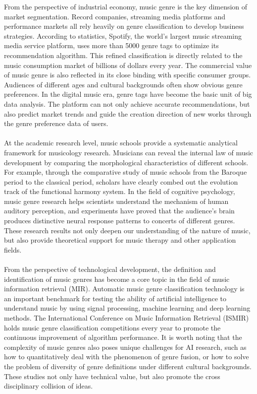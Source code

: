 From the perspective of industrial economy, music genre is the key dimension of market segmentation. Record companies, streaming media platforms and performance markets all rely heavily on genre classification to develop business strategies. According to statistics, Spotify, the world's largest music streaming media service platform, uses more than 5000 genre tags to optimize its recommendation algorithm. This refined classification is directly related to the music consumption market of billions of dollars every year. The commercial value of music genre is also reflected in its close binding with specific consumer groups. Audiences of different ages and cultural backgrounds often show obvious genre preferences. In the digital music era, genre tags have become the basic unit of big data analysis. The platform can not only achieve accurate recommendations, but also predict market trends and guide the creation direction of new works through the genre preference data of users.\\
\\
At the academic research level, music schools provide a systematic analytical framework for musicology research. Musicians can reveal the internal law of music development by comparing the morphological characteristics of different schools. For example, through the comparative study of music schools from the Baroque period to the classical period, scholars have clearly combed out the evolution track of the functional harmony system. In the field of cognitive psychology, music genre research helps scientists understand the mechanism of human auditory perception, and experiments have proved that the audience's brain produces distinctive neural response patterns to concerts of different genres. These research results not only deepen our understanding of the nature of music, but also provide theoretical support for music therapy and other application fields.\\
\\
From the perspective of technological development, the definition and identification of music genres has become a core topic in the field of music information retrieval (MIR). Automatic music genre classification technology is an important benchmark for testing the ability of artificial intelligence to understand music by using signal processing, machine learning and deep learning methods. The International Conference on Music Information Retrieval (ISMIR) holds music genre classification competitions every year to promote the continuous improvement of algorithm performance. It is worth noting that the complexity of music genres also poses unique challenges for AI research, such as how to quantitatively deal with the phenomenon of genre fusion, or how to solve the problem of diversity of genre definitions under different cultural backgrounds. These studies not only have technical value, but also promote the cross disciplinary collision of ideas.\\
